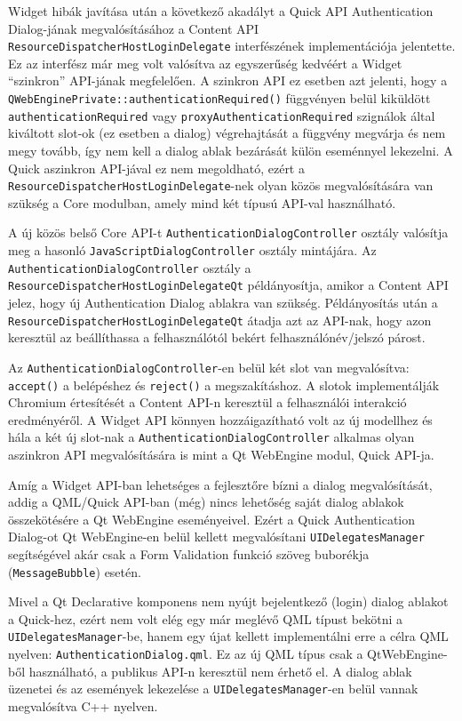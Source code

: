 \documentclass[12pt]{report}
\begin{document}
Widget hibák javítása után a következő akadályt a Quick API Authentication Dialog-jának
megvalósításához a Content API \texttt{ResourceDispatcherHostLoginDelegate} interfészének
implementációja jelentette. Ez az interfész már meg volt valósítva az egyszerűség kedvéért
a Widget ``szinkron'' API-jának megfelelően. A szinkron API ez esetben azt jelenti, hogy a
\texttt{QWebEnginePrivate::authenticationRequired()} függvényen belül kiküldött
\texttt{authenticationRequired} vagy \texttt{proxyAuthenticationRequired} szignálok által
kiváltott slot-ok (ez esetben a dialog) végrehajtását a függvény megvárja és nem megy tovább,
így nem kell a dialog ablak bezárását külön eseménnyel lekezelni. A Quick aszinkron API-jával
ez nem megoldható, ezért a \texttt{ResourceDispatcherHostLoginDelegate}-nek olyan közös
megvalósítására van szükség a Core modulban, amely mind két típusú API-val használható.

A új közös belső Core API-t \texttt{AuthenticationDialogController} osztály valósítja meg
a hasonló \texttt{JavaScriptDialogController} osztály mintájára.
Az \texttt{AuthenticationDialogController} osztály a
\texttt{ResourceDispatcherHostLoginDelegateQt} példányosítja, amikor a Content API jelez,
hogy új Authentication Dialog ablakra van szükség. Példányosítás után a
\texttt{ResourceDispatcherHostLoginDelegateQt} átadja azt az API-nak, hogy azon keresztül
az beállíthassa a felhasználótól bekért felhasználónév/jelszó párost.

Az \texttt{AuthenticationDialogController}-en
belül két slot van megvalósítva: \texttt{accept()} a belépéshez és \texttt{reject()} a
megszakításhoz. A slotok implementálják Chromium értesítését a Content API-n keresztül a
felhasználói interakció eredményéről. A Widget API könnyen hozzáigazítható volt az új
modellhez és hála a két új slot-nak a \texttt{AuthenticationDialogController} alkalmas
olyan aszinkron API megvalósítására is mint a Qt WebEngine modul, Quick API-ja.

Amíg a Widget API-ban lehetséges a fejlesztőre bízni a dialog megvalósítását, addig a
QML/Quick API-ban (még) nincs lehetőség saját dialog ablakok összekötésére a Qt WebEngine
eseményeivel. Ezért a Quick Authentication Dialog-ot Qt WebEngine-en belül kellett
megvalósítani \texttt{UIDelegatesManager} segítségével akár csak a Form Validation funkció
szöveg buborékja (\texttt{MessageBubble}) esetén.

Mivel a Qt Declarative komponens nem nyújt bejelentkező (login) dialog ablakot a Quick-hez,
ezért nem volt elég egy már meglévő QML típust bekötni a \texttt{UIDelegatesManager}-be,
hanem egy újat kellett implementálni erre a célra QML nyelven:
\texttt{AuthenticationDialog.qml}. Ez az új QML típus csak a QtWebEngine-ből használható,
a publikus API-n keresztül nem érhető el. A dialog ablak üzenetei és az események lekezelése
a \texttt{UIDelegatesManager}-en belül vannak megvalósítva C++ nyelven.
\end{document}
